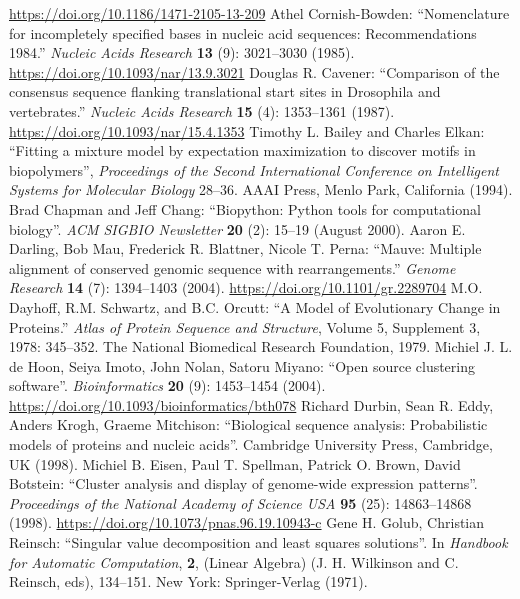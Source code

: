 \documentclass{report}
\begin{document}
\begin{thebibliography}{99}
\url{https://doi.org/10.1186/1471-2105-13-209}
Athel Cornish-Bowden: ``Nomenclature for incompletely specified bases in nucleic acid sequences: Recommendations 1984.'' \textit{Nucleic Acids Research} {\bf 13} (9): 3021--3030 (1985).
\url{https://doi.org/10.1093/nar/13.9.3021}
Douglas R. Cavener: ``Comparison of the consensus sequence flanking translational start sites in Drosophila and vertebrates.'' \textit{Nucleic Acids Research} {\bf 15} (4): 1353--1361 (1987).
\url{https://doi.org/10.1093/nar/15.4.1353}
Timothy L. Bailey and Charles Elkan: ``Fitting a mixture model by expectation maximization to discover motifs in biopolymers'', \textit{Proceedings of the Second International Conference on Intelligent Systems for Molecular Biology} 28--36. AAAI Press, Menlo Park, California (1994).
Brad Chapman and Jeff Chang: ``Biopython: Python tools for computational biology''. \textit{ACM SIGBIO Newsletter} {\bf 20} (2): 15--19 (August 2000).
Aaron E. Darling, Bob Mau, Frederick R. Blattner, Nicole T. Perna: ``Mauve: Multiple alignment of conserved genomic sequence with rearrangements.'' \textit{Genome Research} {\bf 14} (7): 1394--1403 (2004).
\url{https://doi.org/10.1101/gr.2289704}
M.O. Dayhoff, R.M. Schwartz, and B.C. Orcutt: ``A Model of Evolutionary Change in Proteins.'' \textit{Atlas of Protein Sequence and Structure}, Volume 5, Supplement 3, 1978: 345--352. The National Biomedical Research Foundation, 1979.
Michiel J. L. de Hoon, Seiya Imoto, John Nolan, Satoru Miyano: ``Open source clustering software''. \textit{Bioinformatics} {\bf 20} (9): 1453--1454 (2004).
\url{https://doi.org/10.1093/bioinformatics/bth078}
Richard Durbin, Sean R. Eddy, Anders Krogh, Graeme Mitchison:
``Biological sequence analysis: Probabilistic models of proteins and nucleic acids''.
Cambridge University Press, Cambridge, UK (1998).
Michiel B. Eisen, Paul T. Spellman, Patrick O. Brown, David Botstein: ``Cluster analysis and display of genome-wide expression patterns''. \textit{Proceedings of the National Academy of Science USA} {\bf 95} (25): 14863--14868 (1998). \url{https://doi.org/10.1073/pnas.96.19.10943-c}
Gene H. Golub, Christian Reinsch: ``Singular value decomposition and least squares solutions''. In \textit{Handbook for Automatic Computation}, {\bf 2}, (Linear Algebra) (J. H. Wilkinson and C. Reinsch, eds), 134--151. New York: Springer-Verlag (1971).

\end{thebibliography}
\end{document}
